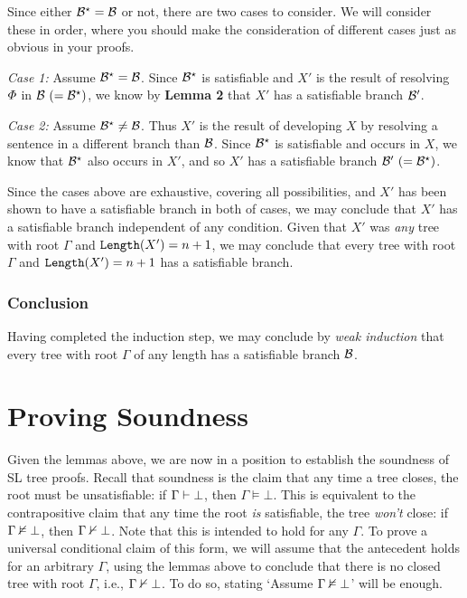 Since either $\mathcal{B}^\star=\mathcal{B}$ or not, there are two cases to consider.
We will consider these in order, where you should make the consideration of different cases just as obvious in your proofs.

\textit{Case 1:} 
  Assume $\mathcal{B}^\star=\mathcal{B}$.
  Since $\mathcal{B}^\star$ is satisfiable and $X'$ is the result of resolving $\varPhi$ in $\mathcal{B}\ (=\mathcal{B}^\star)$, we know by \textbf{Lemma 2} that $X'$ has a satisfiable branch $\mathcal{B}'$. 

\textit{Case 2:} 
  Assume $\mathcal{B}^\star\neq\mathcal{B}$.
  Thus $X'$ is the result of developing $X$ by resolving a sentence in a different branch than $\mathcal{B}$.
  Since $\mathcal{B}^\star$ is satisfiable and occurs in $X$, we know that $\mathcal{B}^\star$ also occurs in $X'$, and so $X'$ has a satisfiable branch $\B'\ (=\B^\star)$.
  
Since the cases above are exhaustive, covering all possibilities, and $X'$ has been shown to have a satisfiable branch in both of cases, we may conclude that $X'$ has a satisfiable branch independent of any condition. 
Given that $X'$ was \textit{any} tree with root $\Gamma$ and $\texttt{Length}(X')=n+1$, we may conclude that every tree with root $\Gamma$ and $\texttt{Length}(X')=n+1$ has a satisfiable branch. 



\subsubsection{Conclusion}

Having completed the induction step, we may conclude by \textit{weak induction} that every tree with root $\Gamma$ of any length has a satisfiable branch $\mathcal{B}$. 


\section{Proving Soundness}

Given the lemmas above, we are now in a position to establish the soundness of SL tree proofs.
Recall that soundness is the claim that any time a tree closes, the root must be unsatisfiable: if $\Gamma \vdash \bot$, then $\Gamma \models \bot$.
This is equivalent to the contrapositive claim that any time the root \emph{is} satisfiable, the tree \emph{won't} close: if $\Gamma \nvDash \bot$, then $\Gamma \nvdash \bot$.
Note that this is intended to hold for any $\Gamma$. 
To prove a universal conditional claim of this form, we will assume that the antecedent holds for an arbitrary $\Gamma$, using the lemmas above to conclude that there is no closed tree with root $\Gamma$, i.e., $\Gamma \nvdash \bot$. 
To do so, stating `Assume $\Gamma \nvDash \bot$' will be enough.

